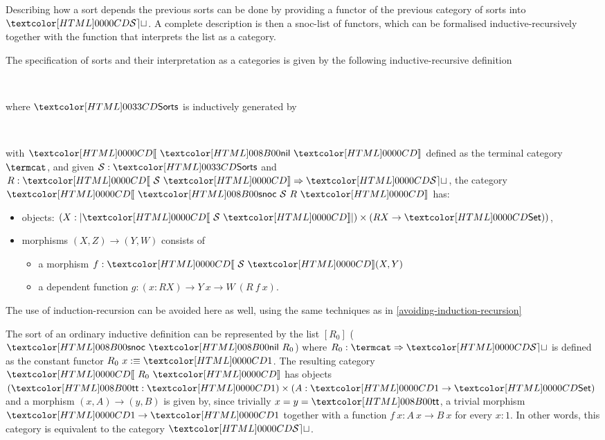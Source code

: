 Describing how a sort depends the previous sorts can be done by
providing a functor of the previous category of sorts into $\SET$. A
complete description is then a snoc-list of functors, which can be
formalised inductive-recursively together with the function that
interprets the list as a category.
% 
\begin{definition}
  The specification of sorts and their interpretation as a
  categories is given by the following inductive-recursive
  definition
  \begin{sorts}
    \sortnamety{\sortsty}{\Set} \\
    \functy{\SortCat{\_}}{\sortsty \to \Cat}
  \end{sorts}
  where $\sortsty$ is inductively generated by
  \begin{datatype}{\sortsty}{}
    \constr{\sortsnil}{\sortsty} \\
    \constr{\sortssnoc}{(\Ss : \sortsty) \to (\Func{\SortCat{\Ss}}{\SET}) \to \sortsty}
  \end{datatype}
  with $\SortCat{\sortsnil}$ defined as the terminal category $\termcat$, and given
  $\Ss : \sortsty$ and $R : \Func{\SortCat{\Ss}}{\SET}$,
  the category $\SortCat{\sortssnoc\ \Ss\ R}$ has:
  \begin{itemize}
  \item objects: $(X : | \SortCat{\Ss} |) \times (R X \to \Set))$,
  \item morphisms $(X,Z) \to (Y,W)$ consists of
    \begin{itemize}
    \item a morphism $f : \SortCat{\Ss}(X,Y)$
    \item a dependent function
      $g : (x : R X) \to Y\ x \to W\ (R\ f\ x)$.
    \end{itemize}
  \end{itemize}
\end{definition}

\begin{remark}
  The use of induction-recursion can be avoided here as well, using
  the same techniques as in \cref{avoiding-induction-recursion}
\end{remark}

\begin{example}
  The sort of an ordinary inductive definition can be represented by
  the list $[R_0]$ (\ie $\sortssnoc\ \sortsnil\ R_0$) where
  $R_0 : \Func{\termcat}{\SET}$ is defined as the constant functor
  $R_0\ x \ddefeq \unitty$. The resulting category $\SortCat{R_0}$ has
  objects $(\unitval : \unitty) \times (A : \unitty \to \Set)$ and a
  morphism $(x, A) \to (y, B)$ is given by, since trivially
  $x = y = \unitval$, a trivial morphism $\unitty \to \unitty$
  together with a function $f\ x : A\ x \to B\ x$ for every $x : 1$. In
  other words, this category is equivalent to the category $\SET$.
\end{example}

